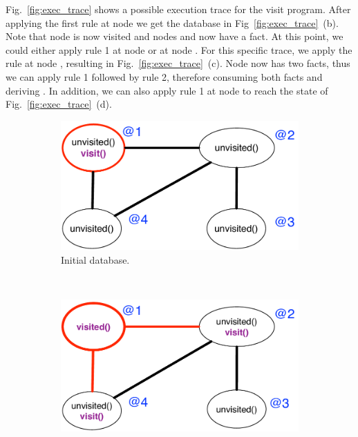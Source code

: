 Fig.~\ref{fig:exec_trace} shows a possible execution trace for the visit
program. After applying the first rule at node  we get the database in
Fig~\ref{fig:exec_trace}~(b).  Note that node  is now visited and nodes
 and  now have a  fact. At this point, we could
either apply rule 1 at node  or at node .  For this specific
trace, we apply the rule at node , resulting in
Fig.~\ref{fig:exec_trace}~(c). Node  now has two  facts,
thus we can apply rule 1 followed by rule 2, therefore consuming both
 facts and deriving . In addition, we can also apply
rule 1 at node  to reach the state of Fig.~\ref{fig:exec_trace}~(d).

\begin{figure}[h]
        \centering
        \begin{subfigure}[b]{0.45\textwidth}
                \includegraphics[width=\textwidth]{figures/visit/trace1}
                \caption{Initial database.}
                \label{fig:exec_trace1}
        \end{subfigure}%
        ~ %
        \begin{subfigure}[b]{0.45\textwidth}
                \includegraphics[width=\textwidth]{figures/visit/trace2}

\end{subfigure}
\end{figure}

